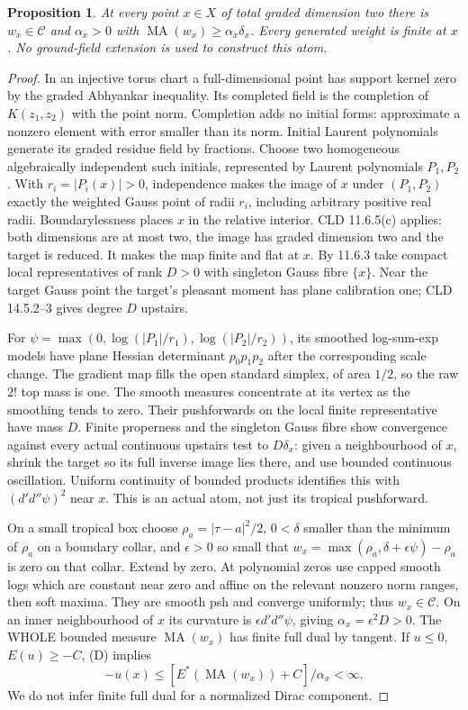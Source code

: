 \documentclass[11pt]{article}
\newcommand{\DD}{d'd''}
\newcommand{\MA}{\operatorname{MA}}
\newcommand{\C}{\mathcal C}
\newtheorem{proposition}[theorem]{Proposition}
\theoremstyle{remark}\newtheorem{remark}[theorem]{Remark}
\begin{document}
\begin{proposition}\label{atoms}
At every point $x\in X$ of total graded dimension two there is
$w_x\in\C$ and $\alpha_x>0$ with
$\MA(w_x)\ge\alpha_x\delta_x$. Every generated weight is finite
at $x$. No ground-field extension is used to construct this atom.
\end{proposition}
\begin{proof}
In an injective torus chart a full-dimensional point has support kernel
zero by the graded Abhyankar inequality. Its completed field is the
completion of $K(z_1,z_2)$ with the point norm. Completion adds no
initial forms: approximate a nonzero element with error smaller than its
norm. Initial Laurent polynomials generate its graded residue field by
fractions. Choose two homogeneous algebraically independent such
initials, represented by Laurent polynomials $P_1,P_2$.
With $r_i=|P_i(x)|>0$, independence makes the image of $x$ under
$(P_1,P_2)$ exactly the weighted Gauss point of radii $r_i$, including
arbitrary positive real radii. Boundarylessness places $x$ in the
relative interior. CLD 11.6.5(c) applies: both dimensions are at most
two, the image has graded dimension two and the target is reduced.
It makes the map finite and flat at $x$. By 11.6.3 take compact local
representatives of rank $D>0$ with singleton Gauss fibre $\{x\}$.
Near the target Gauss point the target's pleasant moment has plane
calibration one; CLD 14.5.2--3 gives degree $D$ upstairs.

For $\psi=\max(0,\log(|P_1|/r_1),\log(|P_2|/r_2))$, its smoothed
log-sum-exp models have plane Hessian determinant $p_0p_1p_2$ after
the corresponding scale change. The gradient map fills the open
standard simplex, of area $1/2$, so the raw $2!$ top mass is one.
The smooth measures concentrate at its vertex as the smoothing tends
to zero. Their pushforwards on the local finite representative have
mass $D$. Finite properness and the singleton Gauss fibre show convergence
against every actual continuous upstairs test to $D\delta_x$:
given a neighbourhood of $x$, shrink the target so its full inverse
image lies there, and use bounded continuous oscillation. Uniform
continuity of bounded products identifies this with $(\DD\psi)^2$
near $x$. This is an actual atom, not just its tropical pushforward.

On a small tropical box choose $\rho_a=|\tau-a|^2/2$,
$0<\delta$ smaller than the minimum of $\rho_a$ on a boundary collar,
and $\epsilon>0$ so small that
$w_x=\max(\rho_a,\delta+\epsilon\psi)-\rho_a$ is zero on that
collar. Extend by zero. At polynomial zeros use capped smooth logs
which are constant near zero and affine on the relevant nonzero norm
ranges, then soft maxima. They are smooth psh and converge uniformly;
thus $w_x\in\C$. On an inner neighbourhood of $x$ its curvature is
$\epsilon\DD\psi$, giving $\alpha_x=\epsilon^2D>0$.
The WHOLE bounded measure $\MA(w_x)$ has finite full dual by tangent.
If $u\le0$, $E(u)\ge-C$, (D) implies
\[
-u(x)\le [E^*(\MA(w_x))+C]/\alpha_x<\infty.
\]
We do not infer finite full dual for a normalized Dirac component.
\end{proof}
\end{document}
